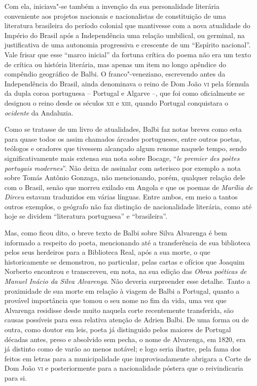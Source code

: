 Com ela, iniciava"-se também a invenção da sua personalidade literária
conveniente aos projetos nacionais e nacionalistas de constituição de uma
literatura brasileira do período colonial que mantivesse com a nova atualidade
do Império do Brasil após a Independência uma relação umbilical, ou germinal, na
justificativa de uma autonomia progressiva e crescente de um ``Espírito
nacional''.  Vale frisar que esse ``marco inicial'' da fortuna crítica do poema
não era um texto de crítica ou história literária, mas apenas um item no longo
apêndice do compêndio geográfico de Balbi.  O franco"-veneziano, escrevendo antes da Independência do Brasil, ainda denominava o reino de Dom João \textsc{vi} pela fórmula da dupla coroa portuguesa -- Portugal e Algarve --, que foi como oficialmente se designou o reino desde os séculos \textsc{xii} e \textsc{xiii}, quando Portugal conquistara o \textit{ocidente} da Andaluzia.

Como se tratasse de um livro de atualidades, Balbi faz notas breves como esta
para quase todos os assim chamados árcades portugueses, entre outros poetas,
teólogos e oradores que tivessem alcançado algum renome naquele tempo, sendo
significativamente mais extensa sua nota sobre Bocage, ``\textit{le premier des
poètes portugais modernes}''.  Não deixa de assinalar com asterisco por exemplo
a nota sobre Tomás Antônio Gonzaga, não mencionando, porém, qualquer relação
dele com o Brasil, senão que morreu exilado em Angola e que os poemas de
\textit{Marília de Dirceu} estavam traduzidos em várias línguas.  Entre ambos,
em meio a tantos outros exemplos, o geógrafo não faz distinção de nacionalidade
literária, como até hoje se dividem ``literatura portuguesa'' e ``brasileira''.

Mas, como ficou dito, o breve texto de Balbi sobre Silva Alvarenga é bem
informado a respeito do poeta, mencionando até a transferência de sua biblioteca
pelos seus herdeiros para a Biblioteca Real, após a sua morte, o que
historicamente se demonstrou, no particular, pelas cartas e ofícios que Joaquim
Norberto encontrou e transcreveu, em nota, na sua edição das \textit{Obras
poéticas de Manuel Inácio da Silva Alvarenga}. Não deveria surpreender esse
detalhe.  Tanto a proximidade de sua morte em relação à viagem de Balbi a
Portugal, quanto a provável importância que tomou o seu nome no fim da vida, uma
vez que Alvarenga residisse desde muito naquela corte recentemente transferida,
são causas possíveis para essa relativa atenção de Adrien Balbi.  De uma forma
ou de outra, como doutor em leis, poeta já distinguido pelos maiores de Portugal
décadas antes, preso e absolvido sem pecha, o nome de Alvarenga, em 1820, era já
distinto como de varão ao menos notável; e logo seria ilustre, pela fama dos
feitos em letras para a municipalidade que improvisadamente abrigara a Corte de
Dom João \textsc{vi} e posteriormente para a nacionalidade póstera que o
reivindicaria para si.

